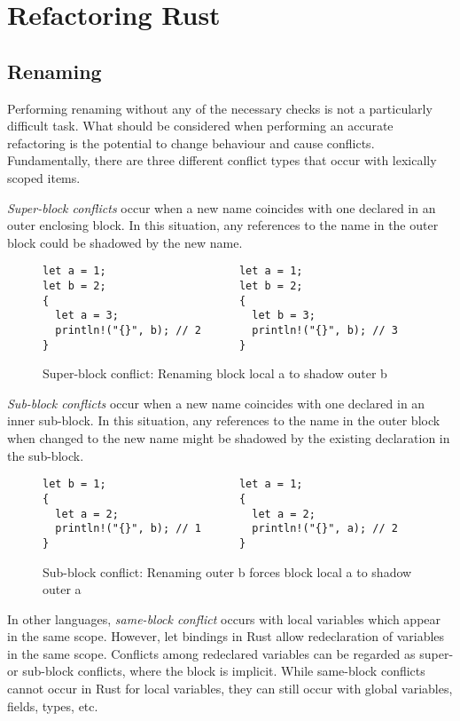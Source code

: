 \section{Refactoring Rust}\label{C:wd}

\subsection{Renaming}

Performing renaming without any of the necessary checks is not a particularly difficult task. What should be considered when performing an accurate refactoring is the potential to change behaviour and cause conflicts. Fundamentally, there are three different conflict types that occur with lexically scoped items.

\textit{Super-block conflicts} occur when a new name coincides with one declared in an outer enclosing block. In this situation, any references to the name in the outer block could be shadowed by the new name.

\begin{figure}[h]
\begin{verbatim}
let a = 1;                     let a = 1;
let b = 2;                     let b = 2;
{                              {
  let a = 3;                     let b = 3;
  println!("{}", b); // 2        println!("{}", b); // 3
}                              }
\end{verbatim}
\caption{Super-block conflict: Renaming block local a to shadow outer b}
\label{Fig:super}
\end{figure}

\textit{Sub-block conflicts} occur when a new name coincides with one declared in an inner sub-block. In this situation, any references to the name in the outer block when changed to the new name might be shadowed by the existing declaration in the sub-block.

\begin{figure}[h]
\begin{verbatim}
let b = 1;                     let a = 1;
{                              {
  let a = 2;                     let a = 2;
  println!("{}", b); // 1        println!("{}", a); // 2
}                              }
\end{verbatim}
\caption{Sub-block conflict: Renaming outer b forces block local a to shadow outer a}
\label{Fig:sub}
\end{figure}

In other languages, \textit{same-block conflict} occurs with local variables which appear in the same scope. However, let bindings in Rust allow redeclaration of variables in the same scope. Conflicts among redeclared variables can be regarded as super- or sub-block conflicts, where the block is implicit. While same-block conflicts cannot occur in Rust for local variables, they can still occur with global variables, fields, types, etc.

